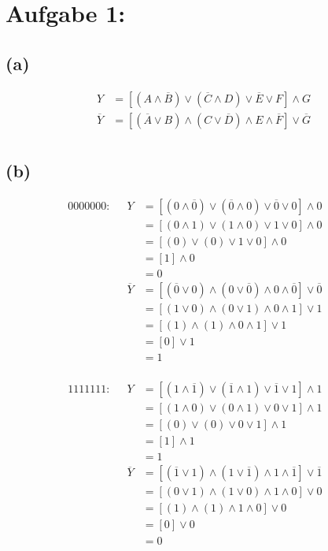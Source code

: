 \documentclass[]{article}
\newcommand{\V}{\lor}
\newcommand{\A}{\land}
\newcommand{\T}[1]{\overline{#1}}
\begin{document}
\section*{Aufgabe 1:}
\subsection*{(a)}
	\begin{align*}
		&& Y &= [(A \A \T{B})\V (\T{C} \A D) \V \T{E} \V F] \A G &&\\
		&& \T{Y} &= [(\T{A} \V B)\A (C \V \T{D}) \A E \A \T{F}] \V \T{G} &&\\
	\end{align*}
\subsection*{(b)}
	\begin{multicols*}{2}
	\begin{align*}
		\text{0000000:}&& Y &= [(0 \A \T{0})\V (\T{0} \A 0) \V \T{0} \V 0] \A 0 &&\\
		&& &= [(0 \A 1)\V (1 \A 0) \V 1 \V 0] \A 0 &&\\
		&& &= [(0)\V (0) \V 1 \V 0] \A 0 &&\\
		&& &= [1] \A 0 &&\\
		&& &= 0 &&\\
		&& \T{Y} &= [(\T{0} \V 0)\A (0 \V \T{0}) \A 0 \A \T{0}] \V \T{0} &&\\
		&& &= [(1 \V 0)\A (0 \V 1) \A 0 \A 1] \V 1 &&\\
		&& &= [(1)\A (1) \A 0 \A 1] \V 1 &&\\
		&& &= [0] \V 1 &&\\
		&& &= 1 &&\\
	\end{align*}

	\begin{align*}
		\text{1111111:}&& Y &= [(1 \A \T{1})\V (\T{1} \A 1) \V \T{1} \V 1] \A 1 &&\\
		&& &= [(1 \A 0)\V (0 \A 1) \V 0 \V 1] \A 1 &&\\
		&& &= [(0)\V (0) \V 0 \V 1] \A 1 &&\\
		&& &= [1] \A 1 &&\\
		&& &= 1 &&\\
		&& \T{Y} &= [(\T{1} \V 1)\A (1 \V \T{1}) \A 1 \A \T{1}] \V \T{1} &&\\
		&& &= [(0 \V 1)\A (1 \V 0) \A 1 \A 0] \V 0 &&\\
		&& &= [(1)\A (1) \A 1 \A 0] \V 0 &&\\
		&& &= [0] \V 0 &&\\
		&& &= 0 &&\\
	\end{align*}


\end{multicols*}
\end{document}
